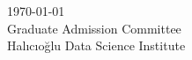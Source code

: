 	\raggedright

	\today \\[12pt] Graduate Admission Committee \\ Halıcıoğlu Data Science Institute \\[24pt]








